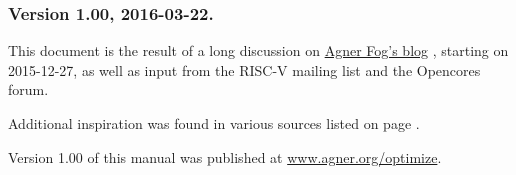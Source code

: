 \documentclass[forwardcom.tex]{subfiles}
\begin{document}
\subsubsection{Version 1.00, 2016-03-22.}
This document is the result of a long discussion on 
\href{http://www.agner.org/optimize/blog/read.php?i=421}{Agner Fog's blog}
, starting on 2015-12-27, as well as input from the RISC-V mailing list and the Opencores forum.
\vspace{2mm}

Additional inspiration was found in various sources listed on page \pageref{referencesToIntroduction}. 
\vspace{2mm}

Version 1.00 of this manual was published at 
\href{http://www.agner.org/optimize}{www.agner.org/optimize}.
\end{document}
